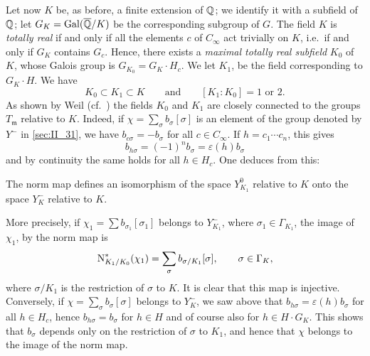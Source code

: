 Let now $K$ be, as before, a finite extension of $\mathbb{Q}$; we identify
it with a subfield of $\mathbb{Q}$; let $G_K = \operatorname{Gal}(\overline{\mathbb{Q}}/K)$ be the corresponding
subgroup of $G$. The field $K$ is \emph{totally real} if and only if all the
elements $c$ of $C_\infty$ act trivially on $K$, i.e.\ if and only if $G_K$
contains $G_c$. Hence, there exists a \emph{maximal totally real subfield}
$K_0$ of $K$, whose Galois group is $G_{K_0} = G_K \cdot H_c$. We let $K_1$, be
the field corresponding to $G_K \cdot H$. We have
\[
	K_0 \subset K_1 \subset K \qquad \text{and} \qquad
	[K_1 : K_0] = 1 \text{ or } 2.
\]
As shown by Weil (cf.\ \cite[4]{47}) the fields $K_0$ and $K_1$ are closely
connected to the groups $T_{\mathfrak{m}}$ relative to $K$. Indeed, if $\chi =
\sum_{\sigma} b_\sigma[\sigma]$ is an element of the group denoted by $Y^-$ in
\ref{sec:II_31}, we have $b_{c\sigma} = -b_\sigma$ for all $c \in C_\infty$. If
$h = c_1 \cdots c_n$, this gives
\[
	b_{h\sigma} = (-1)^n b_\sigma = \varepsilon(h) b_\sigma
\]
and by continuity the same holds for all $h \in H_c$. One deduces from this:

\begin{prop}
	The norm map defines an isomorphism of the space $Y_{K_1}^0$ relative
	to $K$ onto the space $Y_K^-$ relative to $K$.
\end{prop}

More precisely, if $\chi_1 = \sum b_{\sigma_1}[\sigma_1]$ belongs to
\dpage
$Y_{K_1}^-$, where $\sigma_1 \in \Gamma_{K_1}$, the image of $\chi_1$, by the
norm map is
\[
	\operatorname{N}_{K_1/K_0}^*(\chi_1) = \sum_{\sigma} b_{\sigma/K_1}[\sigma], \qquad
	\sigma \in \Gamma_K,
\]
where $\sigma/K_1$ is the restriction of $\sigma$ to $K$. It is clear that this
map is injective. Conversely, if $\chi = \sum_{\sigma} b_\sigma[\sigma]$
belongs to $Y_K^-$, we saw above that $b_{h\sigma} = \varepsilon(h)b_\sigma$
for all $h \in H_c$, hence $b_{h \sigma} = b_\sigma$ for $h \in H$ and of
course also for $h \in H\cdot G_K$. This shows that $b_\sigma$ depends only on
the restriction of $\sigma$ to $K_1$, and hence that $\chi$ belongs to the
image of the norm map.

